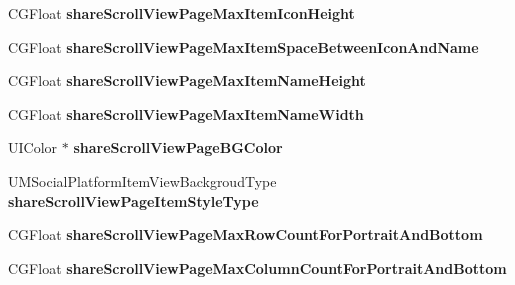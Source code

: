 \begin{DoxyCompactItemize}
\mbox{\label{interface_u_m_social_share_page_scroll_view_config_ad378a1f83eb17c721b0d498e47a22472}} 
C\+G\+Float {\bfseries share\+Scroll\+View\+Page\+Max\+Item\+Icon\+Height}
\item 
\mbox{\label{interface_u_m_social_share_page_scroll_view_config_a9c276e316fffa414d1260dae6731e554}} 
C\+G\+Float {\bfseries share\+Scroll\+View\+Page\+Max\+Item\+Space\+Between\+Icon\+And\+Name}
\item 
\mbox{\label{interface_u_m_social_share_page_scroll_view_config_ab0a47ded86ef10aa30b3426f3217b26f}} 
C\+G\+Float {\bfseries share\+Scroll\+View\+Page\+Max\+Item\+Name\+Height}
\item 
\mbox{\label{interface_u_m_social_share_page_scroll_view_config_a4b6e0a6130948861d62924ac3287dd90}} 
C\+G\+Float {\bfseries share\+Scroll\+View\+Page\+Max\+Item\+Name\+Width}
\item 
\mbox{\label{interface_u_m_social_share_page_scroll_view_config_ac10108eab5653a37a4e76ba456fd9139}} 
U\+I\+Color $\ast$ {\bfseries share\+Scroll\+View\+Page\+B\+G\+Color}
\item 
\mbox{\label{interface_u_m_social_share_page_scroll_view_config_a6a0583f2ddec112161ba852b0bf5864c}} 
U\+M\+Social\+Platform\+Item\+View\+Backgroud\+Type {\bfseries share\+Scroll\+View\+Page\+Item\+Style\+Type}
\item 
\mbox{\label{interface_u_m_social_share_page_scroll_view_config_a1d1c8f844c0a185bf30bdd67861602d5}} 
C\+G\+Float {\bfseries share\+Scroll\+View\+Page\+Max\+Row\+Count\+For\+Portrait\+And\+Bottom}
\item 
\mbox{\label{interface_u_m_social_share_page_scroll_view_config_a5b210a054be84f901cd4b0ae3b22a92a}} 
C\+G\+Float {\bfseries share\+Scroll\+View\+Page\+Max\+Column\+Count\+For\+Portrait\+And\+Bottom}

\end{DoxyCompactItemize}
